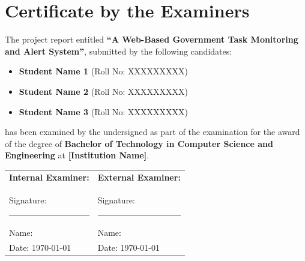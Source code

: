 \chapter*{Certificate by the Examiners}

The project report entitled \textbf{``A Web-Based Government Task Monitoring and Alert System''}, submitted by the following candidates:
\begin{itemize}
    \item \textbf{Student Name 1} (Roll No: XXXXXXXXX)
    \item \textbf{Student Name 2} (Roll No: XXXXXXXXX)
    \item \textbf{Student Name 3} (Roll No: XXXXXXXXX)
\end{itemize}
has been examined by the undersigned as part of the examination for the award of the degree of \textbf{Bachelor of Technology in Computer Science and Engineering} at \textbf{[Institution Name]}.

\vspace{3.5cm}

\noindent
\begin{tabular}{@{}p{7.5cm}p{7.5cm}@{}}
    \textbf{Internal Examiner:} & \textbf{External Examiner:} \\[1.5cm]
    Signature: \rule{5cm}{0.4pt} & Signature: \rule{5cm}{0.4pt} \\
    Name: & Name: \\
    Date: \today & Date: \today \\
\end{tabular}

\clearpage
